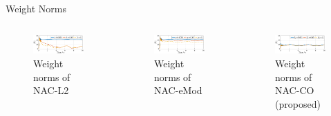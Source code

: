 \documentclass[8pt, aspectratio=169, handout]{beamer}
\begin{document}
\begin{frame}{\insertsubsectionhead}{Weight Norms}

  \begin{columns}


      \begin{figure}      
        \includegraphics[width=0.99\textwidth]{figures/ECC/fig9.eps}
        \caption{Weight norms of NAC-L2}
      \end{figure}
      

      \begin{figure}
        \includegraphics[width=0.99\textwidth]{figures/ECC/fig10.eps}
        \caption{Weight norms of NAC-eMod}
      \end{figure}


      \begin{figure}
        \includegraphics[width=0.99\textwidth]{figures/ECC/fig8.eps}
        \caption{Weight norms of NAC-CO (proposed)}
      \end{figure}
      

\end{columns}
\end{frame}
\end{document}

